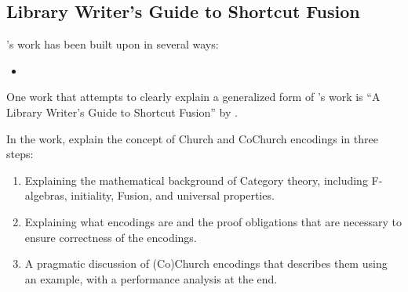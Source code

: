 
\subsection{Library Writer's Guide to Shortcut Fusion}
\cite{Gill1993}'s work has been built upon in several ways:

\begin{itemize}
    \item 
\end{itemize}

One work that attempts to clearly explain a generalized form of \cite{Gill1993}'s work is ``A Library Writer's Guide to Shortcut Fusion'' by \cite{Harper2011}.


In the work, \cite{Harper2011} explain the concept of Church and CoChurch encodings in three steps:
\begin{enumerate}
    \item Explaining the mathematical background of Category theory, including F-algebras, initiality, Fusion, and universal properties.
    \item Explaining what encodings are and the proof obligations that are necessary to ensure correctness of the encodings.
    \item A pragmatic discussion of (Co)Church encodings that describes them using an example, with a performance analysis at the end.
\end{enumerate}


